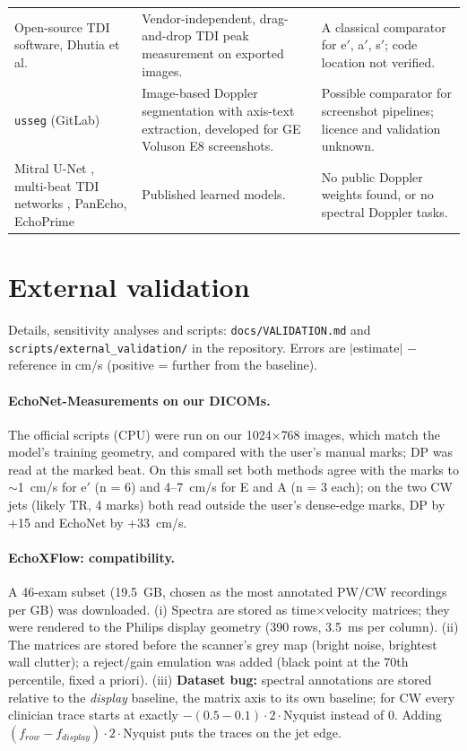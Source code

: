 \documentclass[10pt,a4paper]{article}
\newcommand{\code}[1]{\texttt{\small #1}}
\begin{document}
\begin{center}
\begin{tabularx}{\linewidth}{@{}>{\raggedright\arraybackslash}p{2.9cm}LL@{}}
Open-source TDI software, Dhutia et al.\ \cite{dhutia} & Vendor-independent, drag-and-drop TDI peak measurement on exported images. &
A classical comparator for e$'$, a$'$, s$'$; code location not verified. \\
\code{usseg} (GitLab) & Image-based Doppler segmentation with axis-text extraction, developed for GE Voluson E8 screenshots. & Possible comparator for
screenshot pipelines; licence and validation unknown. \\
Mitral U-Net \cite{mitralunet}, multi-beat TDI networks \cite{lane2023}, PanEcho, EchoPrime & Published learned models. &
No public Doppler weights found, or no spectral Doppler tasks. \\
\bottomrule
\end{tabularx}
\end{center}

\section{External validation}
\label{sec:external}
Details, sensitivity analyses and scripts: \code{docs/VALIDATION.md} and \code{scripts/external\_validation/} in the repository.
Errors are $|$estimate$|$ $-$ reference in cm/s (positive = further from the baseline).

\paragraph{EchoNet-Measurements on our DICOMs.} The official scripts (CPU) were run on our 1024$\times$768 images, which match the model's
training geometry, and compared with the user's manual marks; DP was read at the marked beat. On this small set both methods agree with the
marks to $\sim$1~cm/s for e$'$ (n = 6) and 4--7~cm/s for E and A (n = 3 each); on the two CW jets (likely TR, 4 marks) both read outside the
user's dense-edge marks, DP by +15 and EchoNet by +33~cm/s.

\paragraph{EchoXFlow: compatibility.} A 46-exam subset (19.5~GB, chosen as the most annotated PW/CW recordings per GB) was downloaded.
(i) Spectra are stored as time$\times$velocity matrices; they were rendered to the Philips display geometry (390 rows, 3.5~ms per column).
(ii) The matrices are stored before the scanner's grey map (bright noise, brightest wall clutter); a reject/gain emulation was added (black
point at the 70th percentile, fixed a priori). (iii) \textbf{Dataset bug:} spectral annotations are stored relative to the \emph{display}
baseline, the matrix axis to its own baseline; for CW every clinician trace starts at exactly $-(0.5-0.1)\cdot 2\cdot$Nyquist instead of 0.
Adding $(f_{row}-f_{display})\cdot 2\cdot$Nyquist puts the traces on the jet edge.
\end{document}
